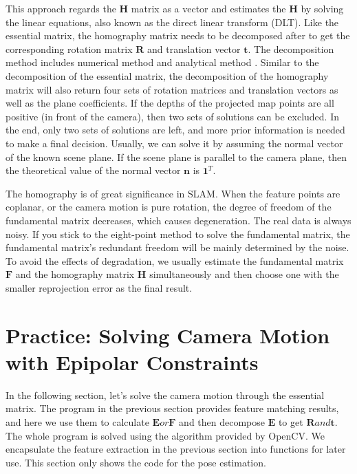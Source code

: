 This approach regards the $\mathbf{H}$ matrix as a vector and estimates the $\mathbf{H}$ by solving the linear equations, also known as the direct linear transform (DLT). Like the essential matrix, the homography matrix needs to be decomposed after to get the corresponding rotation matrix $\mathbf{R}$ and translation vector $\mathbf{t}$. The decomposition method includes numerical method  {\cite{faugeras1988motion, Zhang1996}} and analytical method  {\cite{malis2007deeper}}. Similar to the decomposition of the essential matrix, the decomposition of the homography matrix will also return four sets of rotation matrices and translation vectors as well as the plane coefficients. If the depths of the projected map points are all positive (in front of the camera), then two sets of solutions can be excluded. In the end, only two sets of solutions are left, and more prior information is needed to make a final decision. Usually, we can solve it by assuming the normal vector of the known scene plane. If the scene plane is parallel to the camera plane, then the theoretical value of the normal vector $\mathbf{n}$ is $\mathbf{1}^T$.

The homography is of great significance in SLAM. When the feature points are coplanar, or the camera motion is pure rotation, the degree of freedom of the fundamental matrix decreases, which causes degeneration. The real data is always noisy. If you stick to the eight-point method to solve the fundamental matrix, the fundamental matrix's redundant freedom will be mainly determined by the noise. To avoid the effects of degradation, we usually estimate the fundamental matrix $\mathbf{F}$ and the homography matrix $\mathbf{H}$ simultaneously and then choose one with the smaller reprojection error as the final result.

\section{Practice: Solving Camera Motion with Epipolar Constraints}
In the following section, let's solve the camera motion through the essential matrix. The program in the previous section provides feature matching results, and here we use them to calculate $\mathbf{E} or \mathbf{F}$ and then decompose $ \mathbf{E}$ to get $\mathbf{R} and \mathbf{t}$. The whole program is solved using the algorithm provided by OpenCV. We encapsulate the feature extraction in the previous section into functions for later use. This section only shows the code for the pose estimation.

